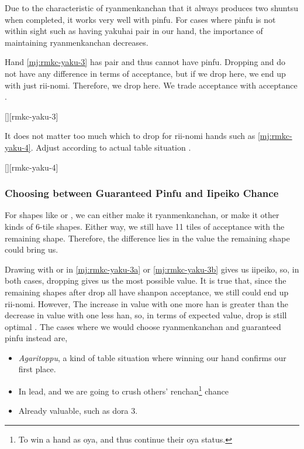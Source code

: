 \documentclass[12pt]{article}
\begin{document}
Due to the characteristic of ryanmenkanchan that it always produces two shuntsu when completed, it works very well with pinfu. For cases where pinfu is not within sight such as having yakuhai pair in our hand, the importance of maintaining ryanmenkanchan decreases.

Hand \ref{mj:rmkc-yaku-3} has  pair and thus cannot have pinfu. Dropping  and  do not have any difference in terms of acceptance, but if we drop  here, we end up with just rii-nomi. Therefore, we drop  here. We trade  acceptance with  acceptance \citep{yoteru-rmkc}.

[][rmkc-yaku-3] 

It does not matter too much which to drop for rii-nomi hands such as \ref{mj:rmkc-yaku-4}. Adjust according to actual table situation \citep{yoteru-rmkc}.

[][rmkc-yaku-4]


\subsubsection*{Choosing between Guaranteed Pinfu and Iipeiko Chance}

For shapes like  or , we can either make it ryanmenkanchan, or make it other kinds of 6-tile shapes. Either way, we still have 11 tiles of acceptance with the remaining shape. Therefore, the difference lies in the value the remaining shape could bring us.

Drawing  with  or  in \ref{mj:rmkc-yaku-3a} or \ref{mj:rmkc-yaku-3b} gives us iipeiko, so, in both cases, dropping  gives us the most possible value. It is true that, since the remaining shapes after  drop all have shanpon acceptance, we still could end up rii-nomi. However, The increase in value with one more han is greater than the decrease in value with one less han, so, in terms of expected value,  drop is still optimal . The cases where we would choose ryanmenkanchan and guaranteed pinfu instead are,

\begin{itemize}
\item \textit{Agaritoppu}, a kind of table situation where winning our hand confirms our first place.
\item In lead, and we are going to crush others' renchan\footnote{To win a hand as oya, and thus continue their oya status.} chance
\item Already valuable, such as dora 3.
\end{itemize}
\end{document}
